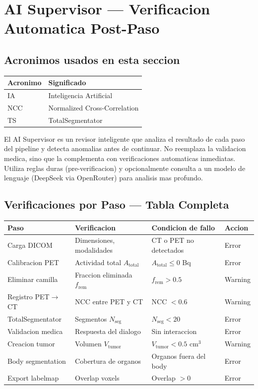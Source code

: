 \documentclass[12pt,a4paper]{article}
\begin{document}
\newpage

\section{AI Supervisor --- Verificacion Automatica Post-Paso}
\label{sec:ai}

\subsection*{Acronimos usados en esta seccion}
\begin{tabular}{ll}
\toprule
\textbf{Acronimo} & \textbf{Significado} \\
\midrule
IA & Inteligencia Artificial \\
NCC & Normalized Cross-Correlation \\
TS & TotalSegmentator \\
\bottomrule
\end{tabular}

El AI Supervisor es un revisor inteligente que analiza el resultado de cada paso del pipeline
y detecta anomalias antes de continuar. No reemplaza la validacion medica, sino que la
complementa con verificaciones automaticas inmediatas. Utiliza reglas duras (pre-verificacion)
y opcionalmente consulta a un modelo de lenguaje (DeepSeek via OpenRouter) para analisis mas
profundo.

\subsection{Verificaciones por Paso --- Tabla Completa}

\begin{table}[H]
\centering
\begin{tabular}{l l l l}
\toprule
\textbf{Paso} & \textbf{Verificacion} & \textbf{Condicion de fallo} & \textbf{Accion} \\
\midrule
Carga DICOM & Dimensiones, modalidades & CT o PET no detectados & Error \\
Calibracion PET & Actividad total $A_{\text{total}}$ & $A_{\text{total}} \leq 0$ Bq & Error \\
Eliminar camilla & Fraccion eliminada $f_{\text{rem}}$ & $f_{\text{rem}} > 0.5$ & Warning \\
Registro PET$\to$CT & NCC entre PET y CT & NCC $< 0.6$ & Warning \\
TotalSegmentator & Segmentos $N_{\text{seg}}$ & $N_{\text{seg}} < 20$ & Error \\
Validacion medica & Respuesta del dialogo & Sin interaccion & Error \\
Creacion tumor & Volumen $V_{\text{tumor}}$ & $V_{\text{tumor}} < 0.5$ cm$^3$ & Warning \\
Body segmentation & Cobertura de organos & Organos fuera del body & Error \\
Export labelmap & Overlap voxels & Overlap $> 0$ & Error \\
\bottomrule
\end{tabular}
\end{table}
\end{document}
